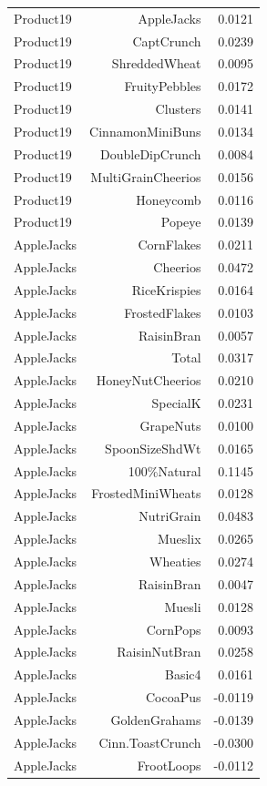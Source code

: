 \begin{longtable}{@{}lrr@{}}
Product19 & AppleJacks & 0.0121 \\
Product19 & CaptCrunch & 0.0239 \\
Product19 & ShreddedWheat & 0.0095 \\
Product19 & FruityPebbles & 0.0172 \\
Product19 & Clusters & 0.0141 \\
Product19 & CinnamonMiniBuns & 0.0134 \\
Product19 & DoubleDipCrunch & 0.0084 \\
Product19 & MultiGrainCheerios & 0.0156 \\
Product19 & Honeycomb & 0.0116 \\
Product19 & Popeye & 0.0139 \\
AppleJacks & CornFlakes & 0.0211 \\
AppleJacks & Cheerios & 0.0472 \\
AppleJacks & RiceKrispies & 0.0164 \\
AppleJacks & FrostedFlakes & 0.0103 \\
AppleJacks & RaisinBran & 0.0057 \\
AppleJacks & Total & 0.0317 \\
AppleJacks & HoneyNutCheerios & 0.0210 \\
AppleJacks & SpecialK & 0.0231 \\
AppleJacks & GrapeNuts & 0.0100 \\
AppleJacks & SpoonSizeShdWt & 0.0165 \\
AppleJacks & 100\%Natural & 0.1145 \\
AppleJacks & FrostedMiniWheats & 0.0128 \\
AppleJacks & NutriGrain & 0.0483 \\
AppleJacks & Mueslix & 0.0265 \\
AppleJacks & Wheaties & 0.0274 \\
AppleJacks & RaisinBran & 0.0047 \\
AppleJacks & Muesli & 0.0128 \\
AppleJacks & CornPops & 0.0093 \\
AppleJacks & RaisinNutBran & 0.0258 \\
AppleJacks & Basic4 & 0.0161 \\
AppleJacks & CocoaPus & -0.0119 \\
AppleJacks & GoldenGrahams & -0.0139 \\
AppleJacks & Cinn.ToastCrunch & -0.0300 \\
AppleJacks & FrootLoops & -0.0112 \\

\end{longtable}
